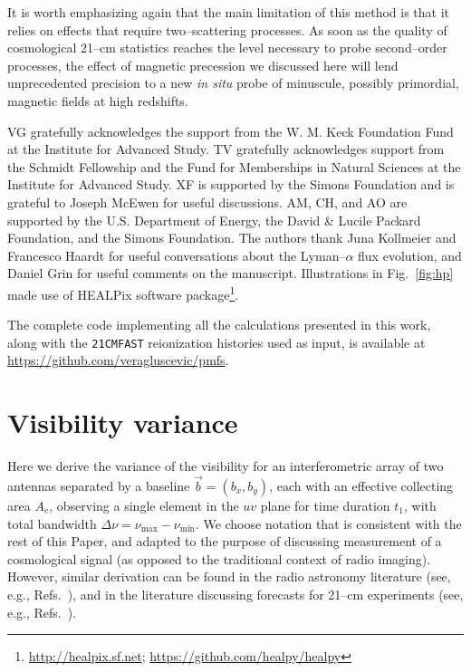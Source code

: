 \documentclass[aps,prd,twocolumn,floatfix,showpacs,superscriptaddress,nofootinbib]{revtex4-1}
\begin{document}
It is worth emphasizing again that the main limitation of this method is that it relies on effects that require two--scattering processes. As soon as the quality of cosmological 21--cm statistics reaches the level necessary to probe second--order processes, the effect of magnetic precession we discussed here will lend unprecedented precision to a new \textit{in situ} probe of minuscule, possibly primordial, magnetic fields at high redshifts. 

 \acknowledgements

VG gratefully acknowledges the support from the W. M. Keck Foundation Fund at the Institute for Advanced Study. TV gratefully acknowledges support from the Schmidt Fellowship and the Fund for Memberships in Natural Sciences at the Institute for Advanced Study. XF is supported by the Simons Foundation and is grateful to Joseph McEwen for useful discussions. AM, CH, and AO are supported by the U.S. Department of Energy, the David \& Lucile Packard Foundation, and the Simons Foundation. The authors thank Juna Kollmeier and Francesco Haardt for useful conversations about the Lyman--$\alpha$ flux evolution, and Daniel Grin for useful comments on the manuscript. Illustrations in Fig.~\ref{fig:hp} made use of HEALPix \cite{2005ApJ...622..759G} software package\footnote{\url{ http://healpix.sf.net}; \url{https://github.com/healpy/healpy}}. 

The complete code implementing all the calculations presented in this work, along with the \texttt{21CMFAST} reionization histories used as input, is available at \url{https://github.com/veragluscevic/pmfs}.
 
\appendix 
\section{Visibility variance}
\label{app:Vrms}
Here we derive the variance of the visibility for an interferometric array of two antennas separated by a baseline $\vec{b}=(b_x,b_y)$, each with an effective collecting area $A_e$, observing a single element in the $uv$ plane for time duration $t_1$, with total bandwidth $\Delta \nu = \nu_\text{max}-\nu_\text{min}$. We choose notation that is consistent with the rest of this Paper, and adapted to the purpose of discussing measurement of a cosmological signal (as opposed to the traditional context of radio imaging). However, similar derivation can be found in the radio astronomy literature (see, e.g., Refs.~\cite{2001isra.book.....T,1986sicn.book.....P}), and in the literature discussing forecasts for 21--cm experiments (see, e.g., Refs.~\cite{2008PhRvD..78b3529M,2009astro2010S..82F,2014ApJ...782...66P,2007ApJ...661....1B,2008PhRvL.100i1302K,2008PhRvD..78b3529M}).
\end{document}
